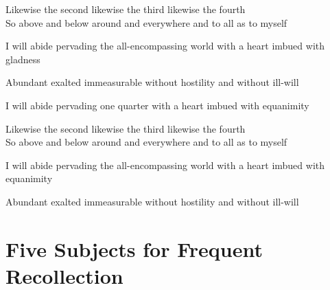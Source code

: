 \begin{english}
Likewise the second likewise the third likewise the fourth\\
So above and below around and everywhere and to all as to myself\\
\end{english}

\begin{english-hang}
I will abide pervading the all-encompassing world with a heart imbued with gladness\\
\end{english-hang}

\begin{english-hang}
Abundant exalted immeasurable without hostility and without ill-will
\end{english-hang}

\medskip

\begin{english-hang}
I will abide pervading one quarter with a heart imbued with equanimity\\
\end{english-hang}

\begin{english}
Likewise the second likewise the third likewise the fourth\\
So above and below around and everywhere and to all as to myself\\
\end{english}

\begin{english-hang}
I will abide pervading the all-encompassing world with a heart imbued with equanimity\\
\end{english-hang}

\begin{english-hang}
Abundant exalted immeasurable without hostility and without ill-will
\end{english-hang}

\suttaRef{[DN 13]}


\section{Five Subjects for Frequent Recollection}
\label{five-recollections}

\begin{leader}
\end{leader}

